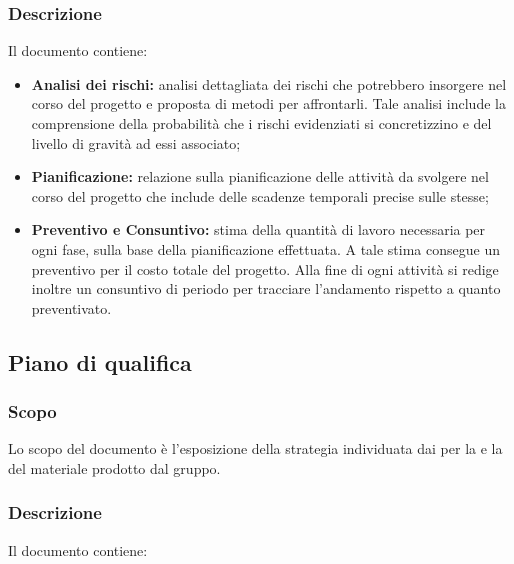 \documentclass[../NormediProgetto.tex]{subfiles}
\begin{document}
\subsubsection{Descrizione}

Il documento contiene:

\begin{itemize}
    \item \textbf{Analisi dei rischi:} analisi dettagliata dei rischi che potrebbero insorgere nel corso del progetto e proposta di metodi per affrontarli. Tale analisi include la comprensione della probabilità che i rischi evidenziati si concretizzino e del livello di gravità ad essi associato;
    
    \item \textbf{Pianificazione:} relazione sulla pianificazione delle attività da svolgere nel corso del progetto che include delle scadenze temporali precise sulle stesse;
    
    \item \textbf{Preventivo e Consuntivo:} stima della quantità di lavoro necessaria per ogni fase, sulla base della pianificazione effettuata. A tale stima consegue un preventivo per il costo totale del progetto. Alla fine di ogni attività si redige inoltre un consuntivo di periodo per tracciare l’andamento rispetto a quanto preventivato.
\end{itemize}


\subsection{Piano di qualifica}

\subsubsection{Scopo}

Lo scopo del documento è l'esposizione della strategia individuata dai  per la  e la  del materiale prodotto dal gruppo. 

\subsubsection{Descrizione}

Il documento contiene:
\end{document}

